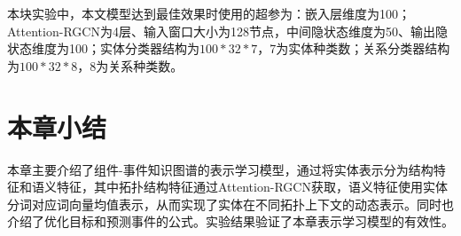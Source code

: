 本块实验中，本文模型达到最佳效果时使用的超参为：嵌入层维度为100；Attention-RGCN为4层、输入窗口大小为128节点，中间隐状态维度为50、输出隐状态维度为100；实体分类器结构为$100*32*7$，7为实体种类数；关系分类器结构为$100*32*8$，8为关系种类数。
\section{本章小结}
本章主要介绍了组件-事件知识图谱的表示学习模型，通过将实体表示分为结构特征和语义特征，其中拓扑结构特征通过Attention-RGCN获取，语义特征使用实体分词对应词向量均值表示，从而实现了实体在不同拓扑上下文的动态表示。同时也介绍了优化目标和预测事件的公式。实验结果验证了本章表示学习模型的有效性。





